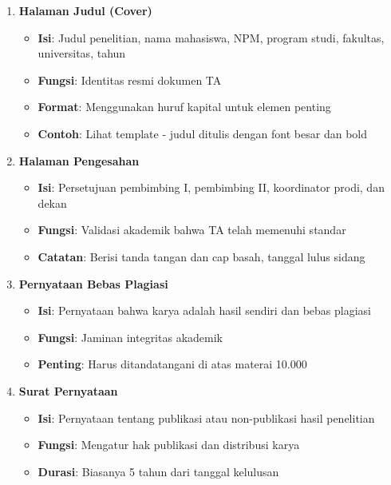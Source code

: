 \begin{enumerate}
    \item \textbf{Halaman Judul (Cover)}
    \begin{itemize}
        \item \textbf{Isi}: Judul penelitian, nama mahasiswa, NPM, program studi, fakultas, universitas, tahun
        \item \textbf{Fungsi}: Identitas resmi dokumen TA
        \item \textbf{Format}: Menggunakan huruf kapital untuk elemen penting
        \item \textbf{Contoh}: Lihat template - judul ditulis dengan font besar dan bold
    \end{itemize}

    \item \textbf{Halaman Pengesahan}
    \begin{itemize}
        \item \textbf{Isi}: Persetujuan pembimbing I, pembimbing II, koordinator prodi, dan dekan
        \item \textbf{Fungsi}: Validasi akademik bahwa TA telah memenuhi standar
        \item \textbf{Catatan}: Berisi tanda tangan dan cap basah, tanggal lulus sidang
    \end{itemize}

    \item \textbf{Pernyataan Bebas Plagiasi}
    \begin{itemize}
        \item \textbf{Isi}: Pernyataan bahwa karya adalah hasil sendiri dan bebas plagiasi
        \item \textbf{Fungsi}: Jaminan integritas akademik
        \item \textbf{Penting}: Harus ditandatangani di atas materai 10.000
    \end{itemize}

    \item \textbf{Surat Pernyataan}
    \begin{itemize}
        \item \textbf{Isi}: Pernyataan tentang publikasi atau non-publikasi hasil penelitian
        \item \textbf{Fungsi}: Mengatur hak publikasi dan distribusi karya
        \item \textbf{Durasi}: Biasanya 5 tahun dari tanggal kelulusan
    \end{itemize}


\end{enumerate}

